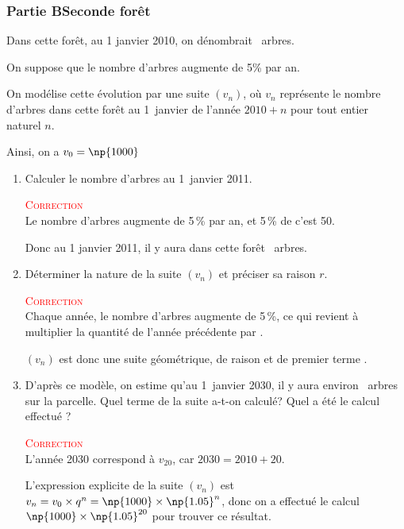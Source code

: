 \subsubsection*{Partie B\hspace{10mm}Seconde forêt}


Dans cette forêt, au 1 janvier 2010, on dénombrait ~arbres.

On suppose que le nombre d'arbres augmente de 5\% par an.

On modélise cette évolution par une suite \mbox{$(v_n)$}, où $v_n$ représente le nombre d'arbres dans cette forêt au 1~janvier de l'année \mbox{$2010+n$} pour tout entier naturel $n$.

Ainsi, on a \mbox{$v_0=\np{1000}$}

\begin{enumerate}
	\item Calculer le nombre d'arbres au 1~janvier 2011.


		\textcolor{red}{\textsc{Correction}}\\
		Le nombre d'arbres augmente de 5\,\% par an, et 5\,\% de  c'est 50.

		Donc au 1 janvier 2011, il y aura dans cette forêt ~arbres.
	\item Déterminer la nature de la suite \mbox{$(v_n)$} et préciser sa raison $r$.

		\textcolor{red}{\textsc{Correction}}\\
		Chaque année, le nombre d'arbres augmente de 5\,\%, ce qui revient à multiplier la quantité de l'année précédente par .

		$(v_n)$ est donc une suite géométrique, de raison  et de premier terme .
	\item D'après ce modèle, on estime qu'au 1~janvier 2030, il y aura environ ~arbres sur la parcelle. Quel terme de la suite a-t-on calculé? Quel a été le calcul effectué ?

		\textcolor{red}{\textsc{Correction}}\\
		L'année 2030 correspond à \mbox{$v_{20}$}, car \mbox{$2030=2010+20$.}


		L'expression explicite de la suite \mbox{$(v_n)$} est \mbox{$v_n=v_0\times q^n= \np{1000}\times \np{1.05}^n$}, donc on a effectué le calcul \mbox{$\np{1000}\times\np{1.05}^{20}$} pour trouver ce résultat.
\end{enumerate}
